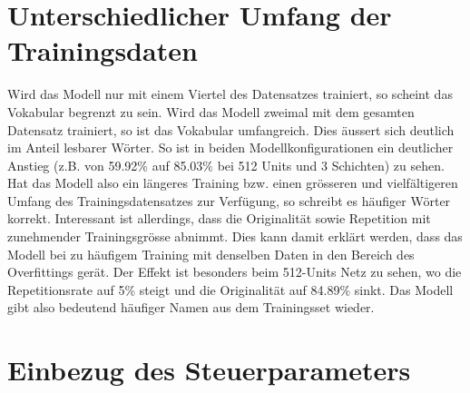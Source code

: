 \section{Unterschiedlicher Umfang der Trainingsdaten}
\label{sec:increase-num-dataset}

Wird das Modell nur mit einem Viertel des Datensatzes trainiert, so scheint das Vokabular begrenzt zu sein.
Wird das Modell zweimal mit dem gesamten Datensatz trainiert, so ist das Vokabular umfangreich.
Dies äussert sich deutlich im Anteil lesbarer Wörter.
So ist in beiden Modellkonfigurationen ein deutlicher Anstieg (z.B. von 59.92\% auf 85.03\% bei 512 Units und 3 Schichten) zu sehen.
Hat das Modell also ein längeres Training bzw. einen grösseren und vielfältigeren Umfang des Trainingsdatensatzes zur Verfügung, so
schreibt es häufiger Wörter korrekt.
Interessant ist allerdings, dass die Originalität sowie Repetition mit zunehmender Trainingsgrösse abnimmt.
Dies kann damit erklärt werden, dass das Modell bei zu häufigem Training mit denselben Daten in den Bereich des Overfittings gerät.
Der Effekt ist besonders beim 512-Units Netz zu sehen, wo die Repetitionsrate auf 5\% steigt und die Originalität auf 84.89\% sinkt.
Das Modell gibt also bedeutend häufiger Namen aus dem Trainingsset wieder.


\section{Einbezug des Steuerparameters}
\label{sec:including-years}

